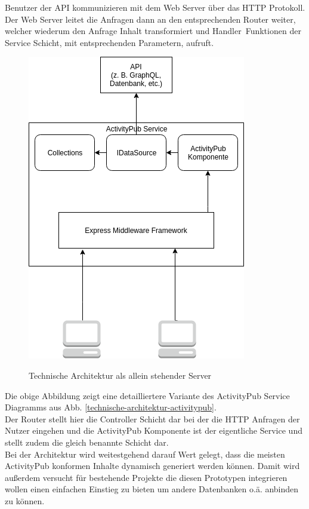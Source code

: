 	Benutzer der API kommunizieren mit dem Web Server über das HTTP Protokoll. Der Web Server leitet die Anfragen dann an den entsprechenden Router weiter, welcher wiederum den Anfrage Inhalt transformiert und \glqq Handler\grqq~Funktionen der Service Schicht, mit entsprechenden Parametern, aufruft.
	\begin{figure}[h]
		\begin{minipage}{\textwidth}
			\centering
			\includegraphics[scale=0.6]{figures/Technische-Architektur-standalone.png}
			\label{technische-architektur-standalone}
			\caption{Technische Architektur als allein stehender Server}
		\end{minipage}
	\end{figure}
	Die obige Abbildung zeigt eine detailliertere Variante des ActivityPub Service Diagramms aus Abb. \ref{technische-architektur-activitypub}.\\
	
	Der Router stellt hier die Controller Schicht dar bei der die HTTP Anfragen der Nutzer eingehen und die ActivityPub Komponente ist der eigentliche Service und stellt zudem die gleich benannte Schicht dar.\\
	
	Bei der Architektur wird weitestgehend darauf Wert gelegt, dass die meisten ActivityPub konformen Inhalte dynamisch generiert werden können. Damit wird außerdem versucht für bestehende Projekte die diesen Prototypen integrieren wollen einen einfachen Einstieg zu bieten um andere Datenbanken o.ä. anbinden zu können.\\